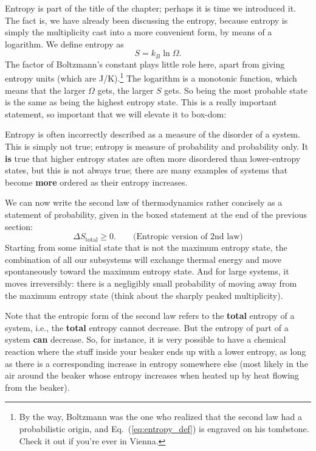 Entropy is part of the title of the chapter; perhaps it is time we
introduced it.  The fact is, we have already been discussing the
entropy, because entropy is simply the multiplicity cast into a more
convenient form, by means of a logarithm.  We define entropy as
\begin{equation}
S = k_B\ln\Omega.
\label{eq:entropy_def}
\end{equation}
The factor of Boltzmann's constant plays little role here, apart from
giving entropy units (which are J/K).\footnote{By the way, Boltzmann
was the one who realized that the second law had a probabilistic origin,
and Eq.~(\ref{eq:entropy_def}) is engraved on his tombstone.  Check it
out if you're ever in Vienna.}  The logarithm is a monotonic function,
which means that the larger $\Omega$ gets, the larger $S$ gets.  So being
the most probable state is the same as being the highest entropy state.
This is a really important statement, so important that we will elevate
it to box-dom:

\break
Entropy is often incorrectly described as a measure of the disorder
of a system.  This is simply not true; entropy is measure of
probability and probability only.  It {\bf is} true that higher
entropy states are often more disordered than lower-entropy states,
but this is not always true; there are many examples
of systems that become {\bf more} ordered as their
entropy increases.

We can now write the second law of thermodynamics rather concisely as
a statement of probability, given in the boxed statement at the end of
the previous section:
\begin{equation}
\Delta S_\text{total} \geq 0. \qquad\text{(Entropic version of 2nd law)}
\end{equation}
Starting from some initial state that is not the maximum entropy
state, the combination of all our subsystems will exchange thermal
energy and move spontaneously toward the maximum entropy state.  And
for large systems, it moves irreversibly: there is a negligibly small
probability of moving away from the maximum entropy state
(think about the sharply peaked multiplicity).

Note that the entropic form of the second law refers to the {\bf total}
entropy of a system, i.e., the {\bf total} entropy cannot decrease.
But the entropy of part of a system {\bf can} decrease.  So, for
instance, it is very possible to have a chemical reaction where
the stuff inside your beaker ends up with a lower entropy,
as long as there is a corresponding increase in entropy somewhere
else (most likely in the air around the beaker whose entropy
increases when heated up by heat flowing from the beaker).

